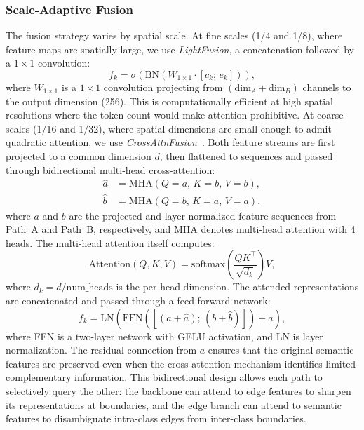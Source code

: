 \documentclass[conference]{IEEEtran}
\begin{document}
\subsubsection{Scale-Adaptive Fusion}
The fusion strategy varies by spatial scale.
At fine scales (1/4 and 1/8), where feature maps are spatially large, we use
\emph{LightFusion}, a concatenation followed by a $1\!\times\!1$ convolution:
\begin{equation}
  f_k = \sigma\!\left(\mathrm{BN}\!\left(W_{1\times1}\cdot[c_k;\,e_k]\right)\right),
  \label{eq:lightfusion}
\end{equation}
where $W_{1\times1}$ is a $1\times1$ convolution projecting from $(\mathrm{dim}_A + \mathrm{dim}_B)$ channels to the output dimension (256). This is
computationally efficient at high spatial resolutions where the token count would make attention
prohibitive. At coarse scales (1/16 and 1/32), where spatial dimensions are small enough to admit quadratic
attention, we use \emph{CrossAttnFusion}~\cite{li2024crossfuse}. Both feature streams are first projected to a common dimension $d$,
then flattened to sequences and passed through bidirectional multi-head cross-attention:
{\scriptsize
\begin{align}
  \hat{a} &= \mathrm{MHA}(Q\!=\!a,\,K\!=\!b,\,V\!=\!b), \label{eq:mha1}\\
  \hat{b} &= \mathrm{MHA}(Q\!=\!b,\,K\!=\!a,\,V\!=\!a), \label{eq:mha2}
\end{align}
}
where $a$ and $b$ are the projected and layer-normalized feature sequences from
Path~A and Path~B, respectively, and MHA denotes multi-head attention with 4 heads. The multi-head attention itself
computes:
\begin{equation}
  \mathrm{Attention}(Q,K,V) = \mathrm{softmax}\!\left(\frac{QK^\top}{\sqrt{d_k}}\right) V,
  \label{eq:attention}
\end{equation}
where $d_k = d/\text{num\_heads}$ is the per-head dimension. The attended representations are concatenated and passed
through a feed-forward network:
\begin{equation}
  f_k = \mathrm{LN}\!\left(\mathrm{FFN}\!\left([(a+\hat{a});\,(b+\hat{b})]\right) + a\right),
  \label{eq:crossattn_out}
\end{equation}
where FFN is a two-layer network with GELU activation, and LN is layer normalization. The residual connection
from $a$ ensures that the original semantic features are preserved even when the cross-attention mechanism
identifies limited complementary information. This bidirectional design allows each path to selectively
query the other: the backbone can attend to edge features to sharpen its representations at boundaries, and
the edge branch can attend to semantic features to disambiguate intra-class edges from inter-class
boundaries.
\end{document}
